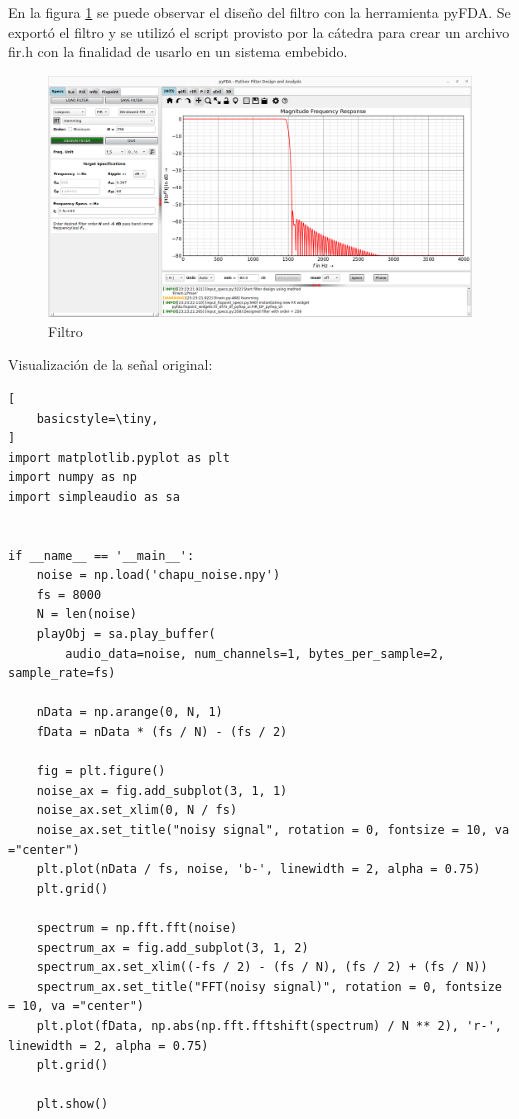 \documentclass[
    11pt,
    spanish,
	a4paper
]{article}
\begin{document}
En la figura \ref{fig:filter} se puede observar el diseño del filtro con la herramienta pyFDA.
Se exportó el filtro y se utilizó el script provisto por la cátedra para crear un archivo fir.h
con la finalidad de usarlo en un sistema embebido.

\begin{figure}[htbp]
	\centering
	\includegraphics[width=\textwidth]{img/filter.png}
	\caption{Filtro}
	\label{fig:filter}
\end{figure}

Visualización de la señal original:

\begin{lstlisting}[
    basicstyle=\tiny,
]
import matplotlib.pyplot as plt
import numpy as np
import simpleaudio as sa


if __name__ == '__main__':
    noise = np.load('chapu_noise.npy')
    fs = 8000
    N = len(noise)
    playObj = sa.play_buffer(
        audio_data=noise, num_channels=1, bytes_per_sample=2, sample_rate=fs)

    nData = np.arange(0, N, 1)
    fData = nData * (fs / N) - (fs / 2)

    fig = plt.figure()
    noise_ax = fig.add_subplot(3, 1, 1)
    noise_ax.set_xlim(0, N / fs)
    noise_ax.set_title("noisy signal", rotation = 0, fontsize = 10, va ="center")
    plt.plot(nData / fs, noise, 'b-', linewidth = 2, alpha = 0.75)
    plt.grid()

    spectrum = np.fft.fft(noise)
    spectrum_ax = fig.add_subplot(3, 1, 2)
    spectrum_ax.set_xlim((-fs / 2) - (fs / N), (fs / 2) + (fs / N))
    spectrum_ax.set_title("FFT(noisy signal)", rotation = 0, fontsize = 10, va ="center")
    plt.plot(fData, np.abs(np.fft.fftshift(spectrum) / N ** 2), 'r-', linewidth = 2, alpha = 0.75)
    plt.grid()

    plt.show()
\end{lstlisting}
\end{document}
